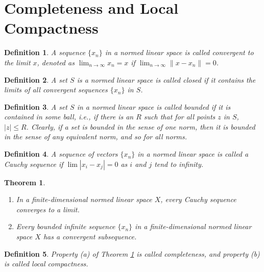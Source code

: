 \documentclass[11pt]{book}
\newtheorem{definition}{Definition}[section]
\newtheorem{theorem}{Theorem}[section]
\theoremstyle{definition}
\numberwithin{equation}{chapter}
\begin{document}
\medskip

\section{Completeness and Local Compactness}

\begin{definition}
A sequence $\{x_n\}$ in a normed linear space is called convergent to the limit $x$, denoted as $\lim_{n \to \infty} x_n = x$ if $\lim_{n \to \infty} \|x - x_n\| = 0$.
\end{definition}

\medskip

\begin{definition}
A set $S$ is a normed linear space is called closed if it contains the limits of all convergent sequences $\{x_n\}$ in $S$.
\end{definition}

\medskip

\begin{definition}
A set $S$ in a normed linear space is called bounded if it is contained in some ball, i.e., if there is an $R$ such that for all points $z$ in $S$, $|z| \leq R$. Clearly, if a set is bounded in the sense of one norm, then it is bounded in the sense of any equivalent norm, and so for all norms.
\end{definition}

\medskip

\begin{definition}
A sequence of vectors $\{x_n\}$ in a normed linear space is called a Cauchy sequence if $\lim |x_i - x_j| = 0$ as $i$ and $j$ tend to infinity.
\end{definition}

\medskip

\begin{theorem}\label{complete_compact_theorem}
~\begin{enumerate}[label=(\alph*)]
    \item In a finite-dimensional normed linear space $X$, every Cauchy sequence converges to a limit.
    
    \item Every bounded infinite sequence $\{x_n\}$ in a finite-dimensional normed linear space $X$ has a convergent subsequence.
\end{enumerate}
\end{theorem}

\medskip

\begin{definition}
Property (a) of Theorem \ref{complete_compact_theorem} is called completeness, and property (b) is called local compactness.
\end{definition}
\end{document}
